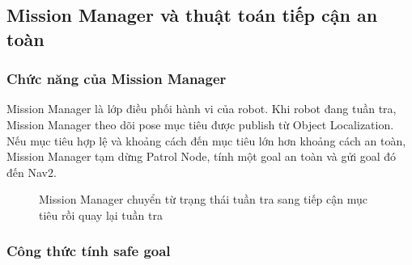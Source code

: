 \subsection{Mission Manager và thuật toán tiếp cận an toàn}\label{subsec:mission-manager}

\subsubsection{Chức năng của Mission Manager}

Mission Manager là lớp điều phối hành vi của robot. Khi robot đang tuần
tra, Mission Manager theo dõi pose mục tiêu được publish từ Object
Localization. Nếu mục tiêu hợp lệ và khoảng cách đến mục tiêu lớn hơn
khoảng cách an toàn, Mission Manager tạm dừng Patrol Node, tính một goal
an toàn và gửi goal đó đến Nav2.

\begin{figure}[H]
\centering
{}
\caption{Mission Manager chuyển từ trạng thái tuần tra sang tiếp cận mục tiêu rồi quay lại tuần tra}
\label{fig:mission-manager-state}
\end{figure}

\subsubsection{Công thức tính safe goal}

